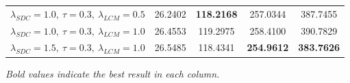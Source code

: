 \begin{table}[!htbp]
\begin{tabular}{lcccc}
        $\lambda_{SDC}=1.0,\ \tau=0.3,\ \lambda_{LCM}=0.5$
        & 26.2402 
        & \textbf{118.2168} 
        & 257.0344 
        & 387.7455  \\

        $\lambda_{SDC}=1.0,\ \tau=0.3,\ \lambda_{LCM}=1.0$
        & 26.4553 
        & 119.2975 
        & 258.4100 
        & 390.7829  \\

        $\lambda_{SDC}=1.5,\ \tau=0.3,\ \lambda_{LCM}=1.0$
        & 26.5485
        & 118.4341 
        & \textbf{254.9612} 
        & \textbf{383.7626}  \\

        \bottomrule[1.25pt]
    \end{tabular}

    \vspace{2mm}
    
    \footnotesize{\textit{Bold values indicate the best result in each column.}}
\end{table}


